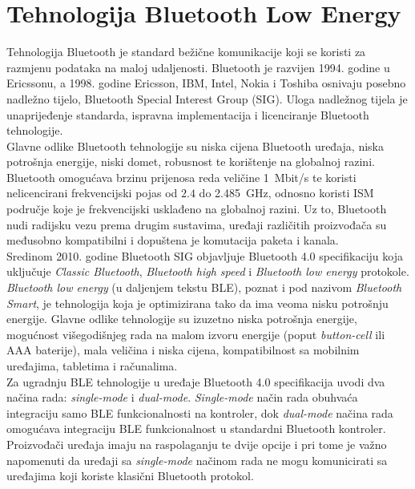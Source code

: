 \chapter{Tehnologija Bluetooth Low Energy}

Tehnologija Bluetooth je standard bežične komunikacije koji se koristi za razmjenu podataka na maloj udaljenosti. 
Bluetooth je razvijen 1994. godine u Ericssonu, a 1998. godine Ericsson, IBM, Intel, Nokia i Toshiba osnivaju posebno nadležno tijelo, Bluetooth Special Interest Group (SIG). 
Uloga nadležnog tijela je unaprijeđenje standarda, ispravna implementacija i licenciranje Bluetooth tehnologije.
\\

Glavne odlike Bluetooth tehnologije su niska cijena Bluetooth uređaja, niska potrošnja energije, niski domet, robusnost te korištenje na globalnoj razini. 
Bluetooth omogućava brzinu prijenosa reda veličine \SI{1}{Mbit/s} te koristi nelicencirani frekvencijski pojas od $2.4$ do \SI{2.485}{GHz}, odnosno koristi ISM područje  koje je frekvencijski usklađeno na globalnoj razini. 
Uz to, Bluetooth nudi radijsku vezu prema drugim sustavima, uređaji različitih proizvođača su međusobno kompatibilni i dopuštena je komutacija paketa i kanala.
\\

Sredinom 2010. godine Bluetooth SIG objavljuje Bluetooth 4.0 specifikaciju koja uključuje \textit{Classic Bluetooth}, \textit{Bluetooth high speed} i \textit{Bluetooth low energy} protokole.
\\
\textit{Bluetooth low energy} (u daljenjem tekstu BLE), poznat i pod nazivom \textit{Bluetooth Smart}, je tehnologija koja je optimizirana tako da ima veoma nisku potrošnju energije. 
Glavne odlike tehnologije su izuzetno niska potrošnja energije, mogućnost višegodišnjeg rada na malom izvoru energije (poput \textit{button-cell} ili AAA baterije), mala veličina i niska cijena, kompatibilnost sa mobilnim uređajima, tabletima i računalima. 
\\
Za ugradnju BLE tehnologije u uređaje Bluetooth 4.0 specifikacija uvodi dva načina rada: \textit{single-mode} i \textit{dual-mode}. 
\textit{Single-mode} način rada obuhvaća integraciju samo BLE funkcionalnosti na kontroler, dok \textit{dual-mode} načina rada omogućava integraciju BLE funkcionalnost u standardni Bluetooth kontroler. 
Proizvođači uređaja imaju na raspolaganju te dvije opcije i pri tome je važno napomenuti da uređaji sa \textit{single-mode} načinom rada ne mogu komunicirati sa uređajima koji koriste klasični Bluetooth protokol.
\\

